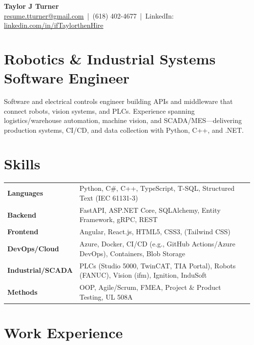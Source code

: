 \documentclass[letterpaper,10pt]{article}
\begin{document}
\small

\begin{center}
{\LARGE \textbf{Taylor J Turner}}\\
\href{mailto:resume.tturner@gmail.com}{resume.tturner@gmail.com} \,|\, (618) 402-4677 \,|\, LinkedIn: \href{https://www.linkedin.com/in/ifTaylorthenHire}{linkedin.com/in/ifTaylorthenHire}
\end{center}

\section*{Robotics \& Industrial Systems Software Engineer}
Software and electrical controls engineer building APIs and middleware that connect robots, vision systems, and PLCs. 
Experience spanning logistics/warehouse automation, machine vision, and SCADA/MES—delivering production systems, CI/CD, and data collection with Python, C++, and .NET.

\section{Skills}
\begin{tabularx}{\textwidth}{@{}p{}X@{}}
\textbf{Languages} & Python, C\#, C++, TypeScript, T-SQL, Structured Text (IEC 61131-3) \\
\textbf{Backend} & FastAPI, ASP.NET Core, SQLAlchemy, Entity Framework, gRPC, REST \\
\textbf{Frontend} & Angular, React.js, HTML5, CSS3, (Tailwind CSS) \\
\textbf{DevOps/Cloud} & Azure, Docker, CI/CD (e.g., GitHub Actions/Azure DevOps), Containers, Blob Storage \\
\textbf{Industrial/SCADA} & PLCs (Studio 5000, TwinCAT, TIA Portal), Robots (FANUC), Vision (ifm), Ignition, InduSoft \\
\textbf{Methods} & OOP, Agile/Scrum, FMEA, Project \& Product Testing, UL 508A
\end{tabularx}

\section{Work Experience}
\end{document}

